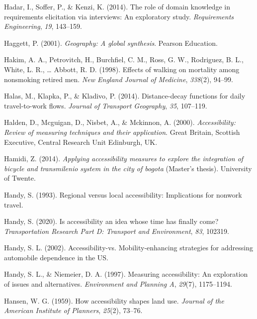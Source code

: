 \documentclass[
11pt, %
oneside, %
english, %
singlespacing, %
]{macthesis} %
\newlength{\cslhangindent}
\newenvironment{CSLReferences}[2] %
{\begin{list}{}{%
	\setlength{\itemindent}{0pt}
	\setlength{\leftmargin}{0pt}
	\setlength{\parsep}{0pt}
	\ifodd #1
	\setlength{\leftmargin}{\cslhangindent}
	\setlength{\itemindent}{-1\cslhangindent}
	\fi
	\setlength{\itemsep}{#2\baselineskip}}}
{\end{list}}
\begin{document}
\begin{CSLReferences}{1}{0}
Hadar, I., Soffer, P., \& Kenzi, K. (2014). The role of domain knowledge in requirements elicitation via interviews: An exploratory study. \emph{Requirements Engineering}, \emph{19}, 143--159.

Haggett, P. (2001). \emph{Geography: A global synthesis}. Pearson Education.

Hakim, A. A., Petrovitch, H., Burchfiel, C. M., Ross, G. W., Rodriguez, B. L., White, L. R., \ldots{} Abbott, R. D. (1998). Effects of walking on mortality among nonsmoking retired men. \emph{New England Journal of Medicine}, \emph{338}(2), 94--99.

Halas, M., Klapka, P., \& Kladivo, P. (2014). Distance-decay functions for daily travel-to-work flows. \emph{Journal of Transport Geography}, \emph{35}, 107--119.

Halden, D., Mcguigan, D., Nisbet, A., \& Mckinnon, A. (2000). \emph{Accessibility: Review of measuring techniques and their application}. Great Britain, Scottish Executive, Central Research Unit Edinburgh, UK.

Hamidi, Z. (2014). \emph{Applying accessibility measures to explore the integration of bicycle and transmilenio system in the city of bogota} (Master's thesis). University of Twente.

Handy, S. (1993). Regional versus local accessibility: Implications for nonwork travel.

Handy, S. (2020). Is accessibility an idea whose time has finally come? \emph{Transportation Research Part D: Transport and Environment}, \emph{83}, 102319.

Handy, S. L. (2002). Accessibility-vs. Mobility-enhancing strategies for addressing automobile dependence in the US.

Handy, S. L., \& Niemeier, D. A. (1997). Measuring accessibility: An exploration of issues and alternatives. \emph{Environment and Planning A}, \emph{29}(7), 1175--1194.

Hansen, W. G. (1959). How accessibility shapes land use. \emph{Journal of the American Institute of Planners}, \emph{25}(2), 73--76.


\end{CSLReferences}
\end{document}
